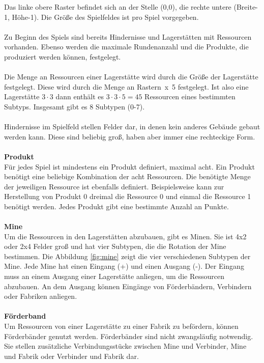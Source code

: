 Das linke obere Raster befindet sich an der Stelle (0,0), die rechte untere (Breite-1, Höhe-1). Die Größe des Spielfeldes ist pro Spiel vorgegeben.
\\\\
Zu Beginn des Spiels sind bereits Hindernisse und Lagerstätten mit Ressourcen vorhanden.
Ebenso werden die maximale Rundenanzahl und die Produkte, die produziert werden können, festgelegt.
\\\\
Die Menge an Ressourcen einer Lagerstätte wird durch die Größe der Lagerstätte festgelegt. Diese wird durch die Menge an Rastern~x~5 festgelegt. Ist also eine Lagerstätte $3 \cdot 3$  dann enthält es $3 \cdot 3\cdot 5 = 45$ Ressourcen eines bestimmten Subtyps. Insgesamt gibt es 8 Subtypen (0-7).
\\\\
Hindernisse im Spielfeld stellen Felder dar, in denen kein anderes Gebäude gebaut werden kann. Diese sind beliebig groß, haben aber immer eine rechteckige Form. 
\\\\
\textbf{Produkt}\\
Für jedes Spiel ist mindestens ein Produkt definiert, maximal acht. Ein Produkt benötigt eine beliebige Kombination der acht Ressourcen. Die benötigte Menge der jeweiligen Ressource ist ebenfalls definiert. Beispielsweise kann zur Herstellung von Produkt 0 dreimal die Ressource 0 und einmal die Ressource 1 benötigt werden. Jedes Produkt gibt eine bestimmte Anzahl an Punkte.
\\\\
\textbf{Mine}\\
Um die Ressourcen in den Lagerstätten abzubauen, gibt es Minen. Sie ist 4x2 oder 2x4 Felder groß und hat vier Subtypen, die die Rotation der Mine bestimmen. Die Abbildung \ref{fig:mine} zeigt die vier verschiedenen Subtypen der Mine.
Jede Mine hat einen Eingang (+) und einen Ausgang (-). Der Eingang muss an einem Ausgang einer Lagerstätte anliegen, um die Ressourcen abzubauen. An dem Ausgang können Eingänge von Förderbändern, Verbindern oder Fabriken anliegen. 
\\\\
\textbf{Förderband}\\
Um Ressourcen von einer Lagerstätte zu einer Fabrik zu befördern, können Förderbänder genutzt werden. Förderbänder sind nicht zwangsläufig notwendig. Sie stellen zusätzliche Verbindungsstücke zwischen Mine und Verbinder, Mine und Fabrik oder Verbinder und Fabrik dar.
